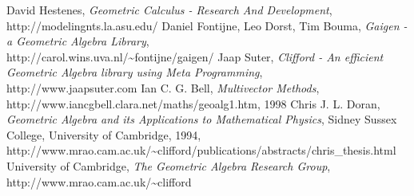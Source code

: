 \documentclass[10pt]{report}
\begin{document}
\begin{thebibliography}{99}
    David Hestenes, \emph{Geometric Calculus - Research And Development}, \\http://modelingnts.la.asu.edu/
    Daniel Fontijne, Leo Dorst, Tim Bouma, \emph{Gaigen - a
    Geometric Algebra Library}, \\http://carol.wins.uva.nl/\~{}fontijne/gaigen/
    Jaap Suter, \emph{Clifford - An efficient Geometric Algebra library using Meta
    Programming},\\
    http://www.jaapsuter.com
    Ian C. G. Bell, \emph{Multivector Methods},\\
    http://www.iancgbell.clara.net/maths/geoalg1.htm, 1998
    Chris J. L. Doran, \emph{Geometric Algebra and its
    Applications to Mathematical Physics}, Sidney Sussex College, University of Cambridge,
    1994, \\
    http://www.mrao.cam.ac.uk/\~{}clifford/publications/abstracts/chris\_thesis.html
    University of Cambridge, \emph{The Geometric Algebra Research Group},
    \\http://www.mrao.cam.ac.uk/\~{}clifford

\end{thebibliography}
\end{document}
